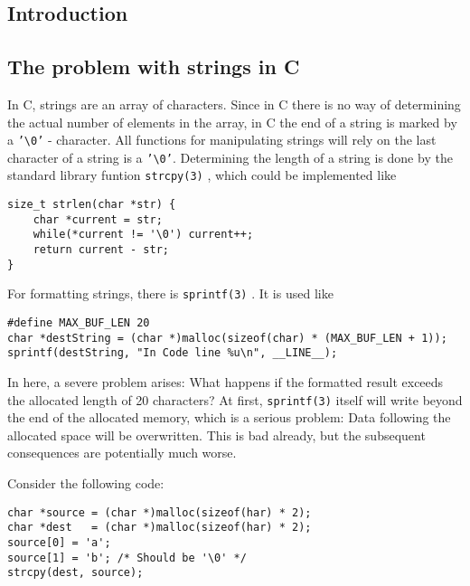 \lstset{language=C}  

\subsection{Introduction}


\subsection{The problem with strings in C}

In C, strings are an array of characters. Since in C there is no way of 
determining the actual number of elements in the array, in C the end of a 
string is marked by a \texttt{'\textbackslash0'} - character.
All functions for manipulating strings will rely on the last character of a
string is a \texttt{'\textbackslash0'}. 
Determining the length of a string is done by the standard library funtion
\texttt{strcpy(3)} , which could be implemented like 

\begin{lstlisting}
size_t strlen(char *str) {
    char *current = str;
    while(*current != '\0') current++;
    return current - str;
}
\end{lstlisting}

For formatting strings, there is \texttt{sprintf(3)} .
It is used like

\begin{lstlisting}
#define MAX_BUF_LEN 20
char *destString = (char *)malloc(sizeof(char) * (MAX_BUF_LEN + 1));
sprintf(destString, "In Code line %u\n", __LINE__);
\end{lstlisting}

In here, a severe problem arises: What happens if the formatted result exceeds
the allocated length of 20 characters?
At first, \texttt{sprintf(3)} itself will write beyond the end of the allocated
 memory, which is a serious problem: 
Data following the allocated space will be overwritten. 
This is bad already, but the subsequent consequences are potentially much worse.

Consider the following code:

\begin{lstlisting}
char *source = (char *)malloc(sizeof(har) * 2);
char *dest   = (char *)malloc(sizeof(har) * 2);
source[0] = 'a';
source[1] = 'b'; /* Should be '\0' */
strcpy(dest, source);
\end{lstlisting}

